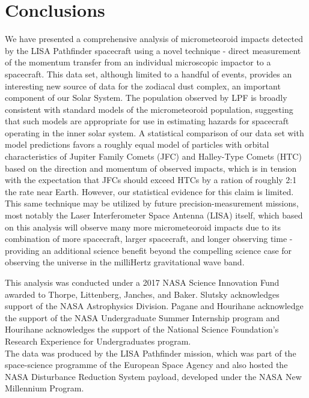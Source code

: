 \documentclass[twocolumn, trackchanges]{aastex62}
\begin{document}
\section{Conclusions} \label{sec:conclusions}
We have presented a comprehensive analysis of micrometeoroid impacts detected by the LISA Pathfinder spacecraft using a novel technique - direct measurement of the momentum transfer from an individual microscopic impactor to a spacecraft. This data set, although limited to a handful of events, provides an interesting new source of data for the zodiacal dust complex, an important component of our Solar System.  The population observed by LPF is broadly consistent with standard models of the micrometeoroid population, suggesting that such models are appropriate for use in estimating hazards for spacecraft operating in the inner solar system.  A statistical comparison of our data set with model predictions favors a roughly equal model of particles with orbital characteristics of Jupiter Family Comets (JFC) and Halley-Type Comets (HTC) based on the direction and momentum of observed impacts, which is in tension with the expectation that JFCs should exceed HTCs by a ration of roughly 2:1 the rate near Earth. However, our statistical evidence for this claim is limited.  This same technique may be utilized by future precision-measurement missions, most notably the Laser Interferometer Space Antenna (LISA) itself, which based on this analysis will observe many more micrometeoroid impacts due to its combination of more spacecraft, larger spacecraft, and longer observing time - providing an additional science benefit beyond the compelling science case for observing the universe in the milliHertz gravitational wave band.

\acknowledgments

This analysis was conducted under a 2017 NASA Science Innovation Fund awarded to Thorpe, Littenberg, Janches, and Baker. Slutsky acknowledges support of the NASA Astrophysics Division. Pagane and Hourihane acknowledge the support of the NASA Undergraduate Summer Internship program and Hourihane acknowledges the support of the National Science Foundation's Research Experience for Undergraduates program.
\\

The data was produced by the LISA Pathfinder mission, which was part of the
space-science programme of the European Space Agency and also hosted the NASA Disturbance Reduction System payload, developed under the NASA New Millennium Program. 
\end{document}

